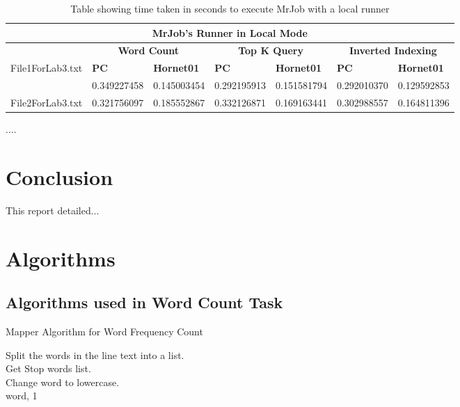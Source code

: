\documentclass[10pt, onecolumn]{article}
\begin{document}
\begin{table}[H]
\centering
\caption{Table showing time taken in seconds to execute MrJob with a local runner}
\label{tbl:MrJobLocalRunnerResults}
\begin{tabular}{|l|l|l|l|l|l|l|}
\hline
\multicolumn{7}{|c|}{\textbf{MrJob's Runner in Local Mode}}                                                                                                                                                 \\ \hline
\textbf{}                         & \multicolumn{2}{c|}{\textbf{Word Count}}                                  & \multicolumn{2}{c|}{\textbf{Top K Query}} & \multicolumn{2}{c|}{\textbf{Inverted Indexing}} \\ \hline
\multirow{2}{*}{File1ForLab3.txt} & \multicolumn{1}{l|}{\textbf{PC}} & \multicolumn{1}{l|}{\textbf{Hornet01}} & \textbf{PC}      & \textbf{Hornet01}      & \textbf{PC}         & \textbf{Hornet01}         \\ \cline{2-7} 
                                  & 0.349227458                      & 0.145003454                            & 0.292195913      & 0.151581794            & 0.292010370         & 0.129592853               \\ \hline
File2ForLab3.txt                  & 0.321756097                      & 0.185552867                            & 0.332126871      & 0.169163441            & 0.302988557         & 0.164811396               \\ \hline
\end{tabular}
\end{table}
.... 
%
\section{Conclusion}
%
This report detailed... 
%

\cleardoublepage
\appendix
\section{Algorithms}
\subsection{Algorithms used in Word Count Task}
\begin{algorithm}[H]
   \label{Alg:MapperWordCount}
    \caption{Mapper Algorithm for Word Frequency Count}
    Split the words in the line text into a list. \\
    Get Stop words list.\\
    {   
        Change word to lowercase.\\
        {
            \Return word, 1
        }
    }
\end{algorithm}
\end{document}
